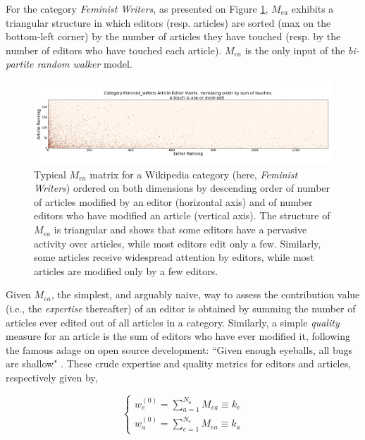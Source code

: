 For the category {\it Feminist Writers}, as presented on Figure \ref{fig:triangle}, $M_{ea}$ exhibits a triangular structure in which editors (resp. articles) are sorted (max on the bottom-left corner) by the number of articles they have touched (resp. by the number of editors who have touched each article). $M_{ea}$ is the only input of the {\it bi-partite random walker} model.
\begin{figure}[!t]
\centering
\includegraphics[width=2.0\columnwidth]{../Figures/Category_Feminist_writerstriangle_matrix_corrected.png}
\caption{Typical $\mathbf{\mathit{M_{ea}}}$ matrix for a Wikipedia category (here, {\it Feminist Writers}) ordered on both dimensions by descending order of number of articles modified by an editor (horizontal axis) and of number editors who have modified an article (vertical axis). The structure of $\mathbf{\mathit{M_{ea}}}$ is triangular and shows that some editors have a pervasive activity over articles, while most editors edit only a few. Similarly, some articles receive widespread attention by editors, while most articles are modified only by a few editors.}
\label{fig:triangle}
\end{figure}


Given $M_{ea}$, the simplest, and arguably naive, way to assess the contribution value (i.e., the {\it expertise} thereafter) of an editor is obtained by summing the number of articles ever edited out of all articles in a category. Similarly, a simple {\it quality} measure for an article is the sum of editors who have ever modified it, following the famous adage on open source development: ``Given enough eyeballs, all bugs are shallow" \cite{raymond1999}. These crude expertise and quality metrics for editors and articles, respectively  given by,

\begin{equation}
\begin{cases}
 w_{e}^{(0)} = \sum_{a=1}^{N_{a}} M_{ea} \equiv k_e\\[7pt]
 w_{a}^{(0)} = \sum_{e=1}^{N_{e}} M_{ea} \equiv k_a
\end{cases}
\label{HHinit}
\end{equation}

